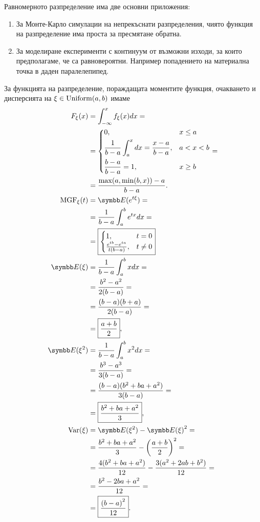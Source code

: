 \documentclass[
  headings=standardclasses,
  bibliography=totocnumbered,
]{scrartcl}
\begin{document}
Равномерното разпределение има две основни приложения:
\begin{enumerate}
  \item За Монте-Карло симулации на непрекъснати разпределения, чиято функция на разпределение има проста за пресмятане обратна.
  \item За моделиране експерименти с континуум от възможни изходи, за които предполагаме, че са равновероятни. Например попадението на материална точка в даден паралелепипед.
\end{enumerate}

За функцията на разпределение, пораждащата моментите функция, очакването и дисперсията на \( \xi \in \operatorname{Uniform}(a, b) \) имаме
\begingroup
\allowdisplaybreaks
\begin{align*}
  F_\xi(x)
  &=
  \int_{-\infty}^x f_\xi(x) dx
  = \\ &=
  \begin{dcases}
    0, &x \leq a \\
    \frac 1 {b-a} \int_a^x dx = \frac {x-a} {b-a}, &a < x < b \\
    \frac {b-a} {b-a} = 1, &x \geq b
  \end{dcases}
  = \\ &=
  \frac {\max(a, \min(b, x))-a} {b-a}.
  \\
  \MGF_\xi(t)
  &=
  \Expect(e^{t\xi})
  = \\ &=
  \frac 1 {b-a} \int_a^b e^{tx} dx
  = \\ &=
  \boxed{\begin{cases}
    1, &t = 0 \\
    \frac {e^{tb} - e^{ta}} {t(b-a)}, &t \neq 0
  \end{cases}}
  \\
  \Expect(\xi)
  &=
  \frac 1 {b-a} \int_a^b x dx
  = \\ &=
  \frac {b^2 - a^2} {2(b-a)}
  = \\ &=
  \frac {(b-a)(b+a)} {2(b-a)}
  = \\ &=
  \boxed{\frac {a + b} 2},
  \\
  \Expect(\xi^2)
  &=
  \frac 1 {b-a} \int_a^b x^2 dx
  = \\ &=
  \frac {b^3 - a^3} {3(b-a)}
  = \\ &=
  \frac {(b-a)(b^2+ba+a^2)} {3(b-a)}
  = \\ &=
  \boxed{\frac {b^2+ba+a^2} 3},
  \\
  \Var(\xi)
  &=
  \Expect(\xi^2) - {\Expect(\xi)}^2
  = \\ &=
  \frac {b^2+ba+a^2} 3 - {\left(\frac {a+b} 2 \right)}^2
  = \\ &=
  \frac {4(b^2+ba+a^2)} {12} - \frac {3 (a^2+2ab+b^2)} {12}
  = \\ &=
  \frac {b^2-2ba+a^2} {12}
  = \\ &=
  \boxed{\frac {{(b-a)}^2} {12}}.
\end{align*}
\endgroup
\end{document}
